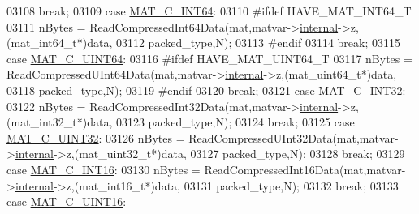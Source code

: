\begin{DoxyCode}
{{{{{{{{{{{{{{{{03108                 \textcolor{keywordflow}{break};
03109             \textcolor{keywordflow}{case} \hyperlink{group___m_a_t_ggad4d60ae7b709fc81bfd744fb4c857c40a1ea83bcde49b35477494412973f82409}{MAT\_C\_INT64}:
03110 \textcolor{preprocessor}{#ifdef HAVE\_MAT\_INT64\_T}
03111                 nBytes = ReadCompressedInt64Data(mat,matvar->\hyperlink{group___m_a_t_a6e97e3ed9f40c49322c18561c2a94e92}{internal}->z,(mat\_int64\_t*)data,
03112                                                  packed\_type,N);
03113 \textcolor{preprocessor}{#endif}
03114                 \textcolor{keywordflow}{break};
03115             \textcolor{keywordflow}{case} \hyperlink{group___m_a_t_ggad4d60ae7b709fc81bfd744fb4c857c40a86470e25c3763d9a24623f04326195dd}{MAT\_C\_UINT64}:
03116 \textcolor{preprocessor}{#ifdef HAVE\_MAT\_UINT64\_T}
03117                 nBytes = ReadCompressedUInt64Data(mat,matvar->\hyperlink{group___m_a_t_a6e97e3ed9f40c49322c18561c2a94e92}{internal}->z,(mat\_uint64\_t*)data,
03118                                                   packed\_type,N);
03119 \textcolor{preprocessor}{#endif}
03120                 \textcolor{keywordflow}{break};
03121             \textcolor{keywordflow}{case} \hyperlink{group___m_a_t_ggad4d60ae7b709fc81bfd744fb4c857c40adb44fc39694e3152ae5e69470a2fefe8}{MAT\_C\_INT32}:
03122                 nBytes = ReadCompressedInt32Data(mat,matvar->\hyperlink{group___m_a_t_a6e97e3ed9f40c49322c18561c2a94e92}{internal}->z,(mat\_int32\_t*)data,
03123                                                  packed\_type,N);
03124                 \textcolor{keywordflow}{break};
03125             \textcolor{keywordflow}{case} \hyperlink{group___m_a_t_ggad4d60ae7b709fc81bfd744fb4c857c40a9a17a7edd45b19ef68197db81b27e816}{MAT\_C\_UINT32}:
03126                 nBytes = ReadCompressedUInt32Data(mat,matvar->\hyperlink{group___m_a_t_a6e97e3ed9f40c49322c18561c2a94e92}{internal}->z,(mat\_uint32\_t*)data,
03127                                                   packed\_type,N);
03128                 \textcolor{keywordflow}{break};
03129             \textcolor{keywordflow}{case} \hyperlink{group___m_a_t_ggad4d60ae7b709fc81bfd744fb4c857c40a40370e9de516c5036a67a5865c071006}{MAT\_C\_INT16}:
03130                 nBytes = ReadCompressedInt16Data(mat,matvar->\hyperlink{group___m_a_t_a6e97e3ed9f40c49322c18561c2a94e92}{internal}->z,(mat\_int16\_t*)data,
03131                                                  packed\_type,N);
03132                 \textcolor{keywordflow}{break};
03133             \textcolor{keywordflow}{case} \hyperlink{group___m_a_t_ggad4d60ae7b709fc81bfd744fb4c857c40a8bede21dbf6c1edc0bbccc1481bccae7}{MAT\_C\_UINT16}:
}}}}}}}}}}}}}}}}
\end{DoxyCode}
